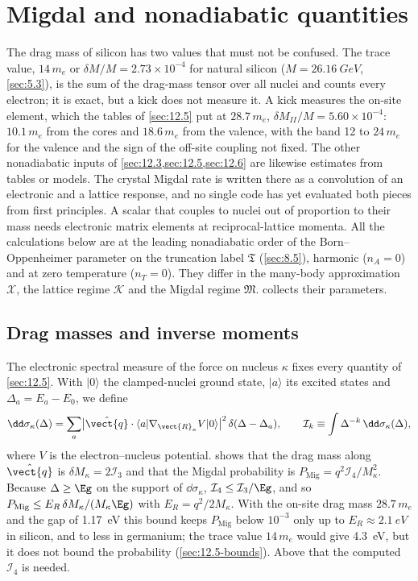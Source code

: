 \section{Migdal and nonadiabatic quantities}\label{app:E.18}

The drag mass of silicon has two values that must not be confused. The trace value, $14\,m_e$ or $\delta M/M = 2.73\times10^{-4}$ for natural silicon ($M = \SI{26.16}{GeV}$, \cref{sec:5.3}), is the sum of the drag-mass tensor over all nuclei and counts every electron; it is exact, but a kick does not measure it. A kick measures the on-site element, which the tables of \cref{sec:12.5} put at $28.7\,m_e$, $\delta M_{II}/M = 5.60\times10^{-4}$: $10.1\,m_e$ from the cores and $18.6\,m_e$ from the valence, with the band 12 to $24\,m_e$ for the valence and the sign of the off-site coupling not fixed. The other nonadiabatic inputs of \cref{sec:12.3,sec:12.5,sec:12.6} are likewise estimates from tables or models. The crystal Migdal rate is written there as a convolution of an electronic and a lattice response, and no single code has yet evaluated both pieces from first principles. A scalar that couples to nuclei out of proportion to their mass needs electronic matrix elements at reciprocal-lattice momenta. All the calculations below are at the leading nonadiabatic order of the Born--Oppenheimer parameter on the truncation label $\mathfrak{T}$ (\cref{sec:8.5}), harmonic ($n_A = 0$) and at zero temperature ($n_T = 0$). They differ in the many-body approximation $\mathcal{X}$, the lattice regime $\mathcal{K}$ and the Migdal regime $\mathfrak{M}$.  collects their parameters.

\subsection{Drag masses and inverse moments}\label{app:E.18-drag}

The electronic spectral measure of the force on nucleus $\kappa$ fixes every quantity of \cref{sec:12.5}. With $|0\rangle$ the clamped-nuclei ground state, $|a\rangle$ its excited states and $\Delta_a = E_a - E_0$, we define
\begin{equation}
  \dd\sigma_\kappa(\Delta) = \sum_a \bigl|\hat{\vect{q}}\cdot\langle a|\nabla_{\vect{R}_\kappa}V|0\rangle\bigr|^2\,\delta(\Delta - \Delta_a) ,
  \qquad
  \mathcal{I}_k \equiv \int \Delta^{-k}\,\dd\sigma_\kappa(\Delta) ,
  \label{eq:E.18-moments}
\end{equation}
where $V$ is the electron--nucleus potential.  shows that the drag mass along $\hat{\vect{q}}$ is $\delta M_\kappa = 2\mathcal{I}_3$ and that the Migdal probability is $P_{\mathrm{Mig}} = q^2\mathcal{I}_4/M_\kappa^2$. Because $\Delta \ge \Eg$ on the support of $\dd\sigma_\kappa$, $\mathcal{I}_4 \le \mathcal{I}_3/\Eg$, and so $P_{\mathrm{Mig}} \le E_R\,\delta M_\kappa/(M_\kappa\Eg)$ with $E_R = q^2/2M_\kappa$. With the on-site drag mass $28.7\,m_e$ and the gap of \SI{1.17}{eV} this bound keeps $P_{\mathrm{Mig}}$ below $10^{-3}$ only up to $E_R \approx \SI{2.1}{eV}$ in silicon, and to less in germanium; the trace value $14\,m_e$ would give \SI{4.3}{eV}, but it does not bound the probability (\cref{sec:12.5-bounds}). Above that the computed $\mathcal{I}_4$ is needed.

